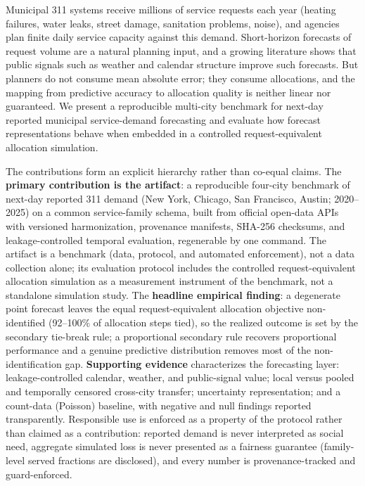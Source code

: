 Municipal 311 systems receive millions of service requests each year
(heating failures, water leaks, street damage, sanitation problems,
noise), and agencies plan finite daily service capacity against this
demand.
Short-horizon forecasts of request volume are a natural planning input,
and a growing literature shows that public signals such as weather and
calendar structure improve such forecasts. But planners do not consume
mean absolute error; they consume allocations, and the mapping from
predictive accuracy to allocation quality is neither linear nor
guaranteed. We present a reproducible multi-city benchmark for next-day
reported municipal service-demand forecasting and evaluate how forecast
representations behave when embedded in a controlled request-equivalent
allocation simulation.

The contributions form an explicit hierarchy rather than co-equal
claims. The \textbf{primary contribution is the artifact}: a reproducible
four-city benchmark of next-day reported 311 demand (New York, Chicago,
San Francisco, Austin; 2020--2025) on a common service-family schema,
built from official open-data APIs with versioned harmonization,
provenance manifests, SHA-256 checksums, and leakage-controlled temporal
evaluation, regenerable by one command. The artifact is a benchmark
(data, protocol, and automated enforcement), not a data collection
alone; its evaluation protocol includes the controlled
request-equivalent allocation simulation as a measurement instrument of
the benchmark, not a standalone simulation study. The \textbf{headline empirical
finding}: a degenerate point forecast leaves the
equal request-equivalent allocation objective non-identified (92--100\%
of allocation steps tied), so the realized outcome is set by the
secondary tie-break rule; a proportional secondary rule recovers
proportional performance and a genuine predictive distribution removes
most of the non-identification gap. \textbf{Supporting evidence}
characterizes the forecasting layer: leakage-controlled calendar,
weather, and public-signal value; local versus pooled and temporally
censored cross-city transfer; uncertainty representation; and a
count-data (Poisson) baseline, with negative and null findings reported
transparently. Responsible use is enforced as a property of the protocol
rather than claimed as a contribution: reported demand is never
interpreted as social need, aggregate simulated loss is never presented
as a fairness guarantee (family-level served fractions are disclosed),
and every number is provenance-tracked and guard-enforced.

